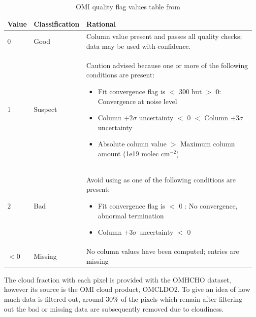     \begin{table}
      \caption{OMI quality flag values table from \citet{Kurosu2014}}
      \begin{tabular}{  l  l  p{10cm} }
        \hline
        \textbf{Value} & \textbf{Classification} & \textbf{Rational} 
        \\ \hline
        0 & Good & Column value present and passes all quality checks; data may be used with confidence. 
        \\ \hline
        1 & Suspect & Caution advised because one or more of the following conditions are present: 
          \begin{itemize}
            \item Fit convergence flag is $<$ 300 but $>$ 0: Convergence at noise level
            \item Column $+ 2 \sigma$ uncertainty $<$ 0 $<$ Column $ + 3 \sigma $ uncertainty
            \item Absolute column value $>$ Maximum column amount (1e19 molec cm$^{-2}$)
          \end{itemize}
        \\ \hline
        2 & Bad & Avoid using as one of the following conditions are present: 
          \begin{itemize}
            \item Fit convergence flag is $<$ 0 : No convergence, abnormal termination
            \item Column $+ 3 \sigma$ uncertainty $<$ 0
          \end{itemize}
        \\ \hline
        $<0$ & Missing & No column values have been computed; entries are missing
        \\ \hline
      \end{tabular}
    \label{ch_HCHO:tab:OMIQualityFlag}
    \end{table}
    
    The cloud fraction with each pixel is provided with the OMHCHO dataset, however its source is the OMI cloud product, OMCLDO2.
    To give an idea of how much data is filtered out, around 30\% of the pixels which remain after filtering out the bad or missing data are subsequently removed due to cloudiness.
    
